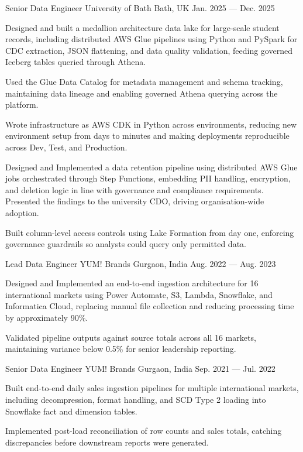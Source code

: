 \begin{cventries}
  \cventry
    {Senior Data Engineer}
    {University of Bath}
    {Bath, UK}
    {Jan. 2025 --- Dec. 2025}
    {
      \begin{cvitems}
        \item {Designed and built a medallion architecture data lake for large-scale student records, including distributed AWS Glue pipelines using Python and PySpark for CDC extraction, JSON flattening, and data quality validation, feeding governed Iceberg tables queried through Athena.}
        \item {Used the Glue Data Catalog for metadata management and schema tracking, maintaining data lineage and enabling governed Athena querying across the platform.}
        \item {Wrote infrastructure as AWS CDK in Python across environments, reducing new environment setup from days to minutes and making deployments reproducible across Dev, Test, and Production.}
        \item {Designed and Implemented a data retention pipeline using distributed AWS Glue jobs orchestrated through Step Functions, embedding PII handling, encryption, and deletion logic in line with governance and compliance requirements. Presented the findings to the university CDO, driving organisation-wide adoption.}
        \item {Built column-level access controls using Lake Formation from day one, enforcing governance guardrails so analysts could query only permitted data.}
      \end{cvitems}
    }

  \cventry
    {Lead Data Engineer}
    {YUM! Brands}
    {Gurgaon, India}
    {Aug. 2022 --- Aug. 2023}
    {
      \begin{cvitems}
        \item {Designed and Implemented an end-to-end ingestion architecture for 16 international markets using Power Automate, S3, Lambda, Snowflake, and Informatica Cloud, replacing manual file collection and reducing processing time by approximately 90\%.}
        \item {Validated pipeline outputs against source totals across all 16 markets, maintaining variance below 0.5\% for senior leadership reporting.}
      \end{cvitems}
    }

  \cventry
    {Senior Data Engineer}
    {YUM! Brands}
    {Gurgaon, India}
    {Sep. 2021 --- Jul. 2022}
    {
      \begin{cvitems}
        \item {Built end-to-end daily sales ingestion pipelines for multiple international markets, including decompression, format handling, and SCD Type 2 loading into Snowflake fact and dimension tables.}
        \item {Implemented post-load reconciliation of row counts and sales totals, catching discrepancies before downstream reports were generated.}
      \end{cvitems}
    }


\end{cventries}
